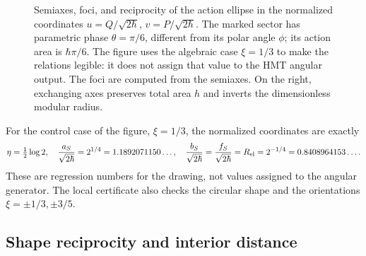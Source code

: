 \begin{figure}[htbp]
\endgroup

 \caption{Semiaxes, foci, and reciprocity of the action ellipse in the
 normalized coordinates \(u=Q/\sqrt{2\hbar}\),
 \(v=P/\sqrt{2\hbar}\). The marked sector has parametric phase
 \(\theta=\pi/6\), different from its polar angle \(\phi\); its action
 area is \(\hbar\pi/6\). The figure uses the algebraic case
 \(\xi=1/3\) to make the relations legible: it does not assign that value
 to the HMT angular output. The foci are computed from the semiaxes.
 On the right, exchanging axes preserves total area \(h\)
 and inverts the dimensionless modular radius.}
 \label{fig:ii-elipse-calculada}
\end{figure}

For the control case of the figure, \(\xi=1/3\), the normalized
coordinates are exactly
\[
 \eta=\tfrac12\log2,\quad
 \frac{a_S}{\sqrt{2\hbar}}=2^{1/4}=1.1892071150\ldots,\quad
 \frac{b_S}{\sqrt{2\hbar}}=
 \frac{f_S}{\sqrt{2\hbar}}=R_{\rm el}=2^{-1/4}=0.8408964153\ldots.
\]
These are regression numbers for the drawing, not values assigned to the angular
generator. The local certificate also checks the circular shape and
the orientations \(\xi=\pm1/3,\pm3/5\).

\subsection{Shape reciprocity and interior distance}

